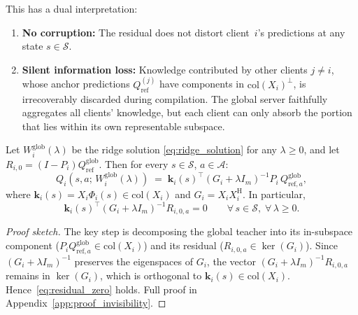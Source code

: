 This has a dual interpretation:
\begin{enumerate}[label=(\roman*)]
    \item \textbf{No corruption:} The residual does not distort
    client~$i$'s predictions at any state $s \in \mathcal{S}$.
    \item \textbf{Silent information loss:} Knowledge contributed by
    other clients $j \neq i$, whose anchor predictions
    $Q^{(j)}_{\mathrm{ref}}$ have components in
    $\mathrm{col}(X_i)^{\perp}$, is irrecoverably discarded during
    compilation. The global server faithfully aggregates all clients'
    knowledge, but each client can only absorb the portion that lies
    within its own representable subspace.
\end{enumerate}

\begin{theorem}
\label{thm:invisibility}
Let $W^{\mathrm{glob}}_i(\lambda)$ be the ridge solution
\eqref{eq:ridge_solution} for any $\lambda \geq 0$, and let
$R_{i,0} = (I - P_i)Q^{\mathrm{glob}}_{\mathrm{ref}}$. Then for
every $s \in \mathcal{S}$, $a \in \mathcal{A}$:
\begin{equation}
    Q_i\!\left(s, a;\, W^{\mathrm{glob}}_i(\lambda)\right)
    \;=\;
    \mathbf{k}_i(s)^{\!\top}
    (G_i + \lambda I_m)^{-1}
    P_i\, Q^{\mathrm{glob}}_{\mathrm{ref},a},
    \label{eq:representer_visible}
\end{equation}
where $\mathbf{k}_i(s) = X_i\Phi_i(s) \in \mathrm{col}(X_i)$ and
$G_i = X_i X_i^{\mathrm{H}}$. In particular,
\begin{equation}
    \mathbf{k}_i(s)^{\!\top}(G_i + \lambda I_m)^{-1} R_{i,0,a} = 0
    \qquad \forall\, s \in \mathcal{S},\; \forall\, \lambda \geq 0.
    \label{eq:residual_zero}
\end{equation}
\end{theorem}

\begin{proof}[Proof sketch]
The key step is decomposing the global teacher into its in-subspace component
($P_i Q^{\mathrm{glob}}_{\mathrm{ref},a} \in \mathrm{col}(X_i)$) and its residual
($R_{i,0,a} \in \ker(G_i)$). Since $(G_i + \lambda I_m)^{-1}$ preserves the eigenspaces of $G_i$,
the vector $(G_i+\lambda I_m)^{-1}R_{i,0,a}$ remains in $\ker(G_i)$,
which is orthogonal to $\mathbf{k}_i(s) \in \mathrm{col}(X_i)$.
Hence~\eqref{eq:residual_zero} holds. Full proof in Appendix~\ref{app:proof_invisibility}.
\end{proof}

